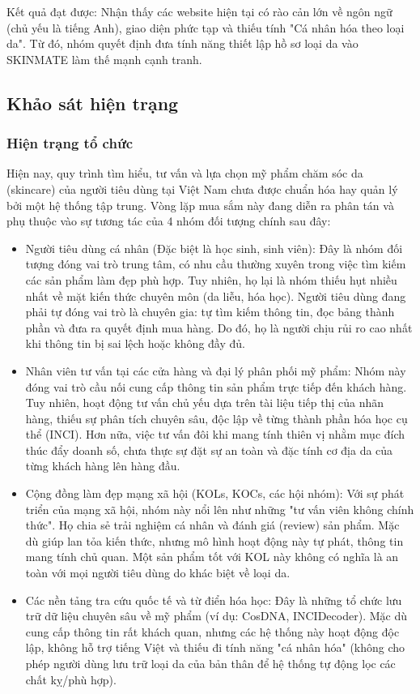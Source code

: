 \documentclass[12pt,a4paper]{article}
\begin{document}
Kết quả đạt được: Nhận thấy các website hiện tại có rào cản lớn về ngôn ngữ (chủ yếu là tiếng Anh), giao diện phức tạp và thiếu tính "Cá nhân hóa theo loại da". Từ đó, nhóm quyết định đưa tính năng thiết lập hồ sơ loại da vào SKINMATE làm thế mạnh cạnh tranh.

\subsection{Khảo sát hiện trạng}

\subsubsection{Hiện trạng tổ chức}
Hiện nay, quy trình tìm hiểu, tư vấn và lựa chọn mỹ phẩm chăm sóc da (skincare) của người tiêu dùng tại Việt Nam chưa được chuẩn hóa hay quản lý bởi một hệ thống tập trung. Vòng lặp mua sắm này đang diễn ra phân tán và phụ thuộc vào sự tương tác của 4 nhóm đối tượng chính sau đây:
\begin{itemize}
    \item Người tiêu dùng cá nhân (Đặc biệt là học sinh, sinh viên):
Đây là nhóm đối tượng đóng vai trò trung tâm, có nhu cầu thường xuyên trong việc tìm kiếm các sản phẩm làm đẹp phù hợp. Tuy nhiên, họ lại là nhóm thiếu hụt nhiều nhất về mặt kiến thức chuyên môn (da liễu, hóa học). Người tiêu dùng đang phải tự đóng vai trò là chuyên gia: tự tìm kiếm thông tin, đọc bảng thành phần và đưa ra quyết định mua hàng. Do đó, họ là người chịu rủi ro cao nhất khi thông tin bị sai lệch hoặc không đầy đủ.

    \item Nhân viên tư vấn tại các cửa hàng và đại lý phân phối mỹ phẩm:
Nhóm này đóng vai trò cầu nối cung cấp thông tin sản phẩm trực tiếp đến khách hàng. Tuy nhiên, hoạt động tư vấn chủ yếu dựa trên tài liệu tiếp thị của nhãn hàng, thiếu sự phân tích chuyên sâu, độc lập về từng thành phần hóa học cụ thể (INCI). Hơn nữa, việc tư vấn đôi khi mang tính thiên vị nhằm mục đích thúc đẩy doanh số, chưa thực sự đặt sự an toàn và đặc tính cơ địa da của từng khách hàng lên hàng đầu.

    \item Cộng đồng làm đẹp mạng xã hội (KOLs, KOCs, các hội nhóm):
Với sự phát triển của mạng xã hội, nhóm này nổi lên như những "tư vấn viên không chính thức". Họ chia sẻ trải nghiệm cá nhân và đánh giá (review) sản phẩm. Mặc dù giúp lan tỏa kiến thức, nhưng mô hình hoạt động này tự phát, thông tin mang tính chủ quan. Một sản phẩm tốt với KOL này không có nghĩa là an toàn với mọi người tiêu dùng do khác biệt về loại da.

    \item Các nền tảng tra cứu quốc tế và từ điển hóa học:
Đây là những tổ chức lưu trữ dữ liệu chuyên sâu về mỹ phẩm (ví dụ: CosDNA, INCIDecoder). Mặc dù cung cấp thông tin rất khách quan, nhưng các hệ thống này hoạt động độc lập, không hỗ trợ tiếng Việt và thiếu đi tính năng "cá nhân hóa" (không cho phép người dùng lưu trữ loại da của bản thân để hệ thống tự động lọc các chất kỵ/phù hợp).
\end{itemize}
\end{document}
